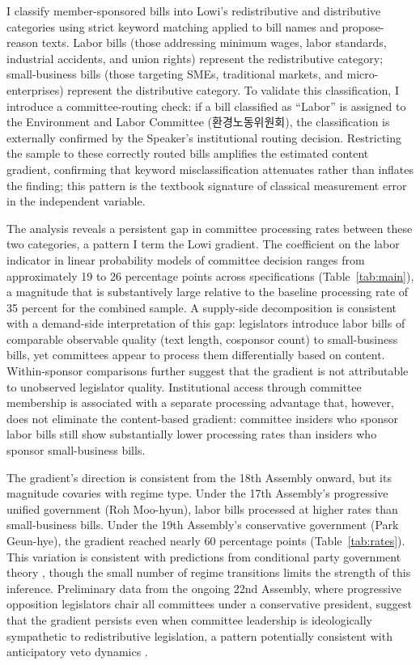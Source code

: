 \documentclass[11pt]{article}
\begin{document}
I classify member-sponsored bills into Lowi's redistributive and distributive categories using strict keyword matching applied to bill names and propose-reason texts. Labor bills (those addressing minimum wages, labor standards, industrial accidents, and union rights) represent the redistributive category; small-business bills (those targeting SMEs, traditional markets, and micro-enterprises) represent the distributive category. To validate this classification, I introduce a committee-routing check: if a bill classified as ``Labor'' is assigned to the Environment and Labor Committee (환경노동위원회), the classification is externally confirmed by the Speaker's institutional routing decision. Restricting the sample to these correctly routed bills amplifies the estimated content gradient, confirming that keyword misclassification attenuates rather than inflates the finding; this pattern is the textbook signature of classical measurement error in the independent variable.

The analysis reveals a persistent gap in committee processing rates between these two categories, a pattern I term the Lowi gradient. The coefficient on the labor indicator in linear probability models of committee decision ranges from approximately 19 to 26 percentage points across specifications (Table~\ref{tab:main}), a magnitude that is substantively large relative to the baseline processing rate of 35 percent for the combined sample. A supply-side decomposition is consistent with a demand-side interpretation of this gap: legislators introduce labor bills of comparable observable quality (text length, cosponsor count) to small-business bills, yet committees appear to process them differentially based on content. Within-sponsor comparisons further suggest that the gradient is not attributable to unobserved legislator quality. Institutional access through committee membership is associated with a separate processing advantage that, however, does not eliminate the content-based gradient: committee insiders who sponsor labor bills still show substantially lower processing rates than insiders who sponsor small-business bills.

The gradient's direction is consistent from the 18th Assembly onward, but its magnitude covaries with regime type. Under the 17th Assembly's progressive unified government (Roh Moo-hyun), labor bills processed at higher rates than small-business bills. Under the 19th Assembly's conservative government (Park Geun-hye), the gradient reached nearly 60 percentage points (Table~\ref{tab:rates}). This variation is consistent with predictions from conditional party government theory \citep{aldrich2001}, though the small number of regime transitions limits the strength of this inference. Preliminary data from the ongoing 22nd Assembly, where progressive opposition legislators chair all committees under a conservative president, suggest that the gradient persists even when committee leadership is ideologically sympathetic to redistributive legislation, a pattern potentially consistent with anticipatory veto dynamics \citep{cameron2000}.
\end{document}
